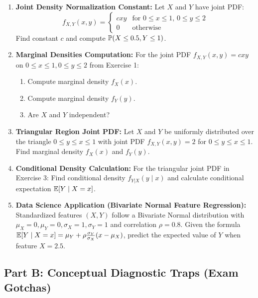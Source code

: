 \begin{enumerate}
\item \textbf{Joint Density Normalization Constant:} Let $X$ and $Y$ have joint PDF:
    $$f_{X,Y}(x, y) = \begin{cases} c x y & \text{for } 0 \le x \le 1, \, 0 \le y \le 2 \\ 0 & \text{otherwise} \end{cases}$$
    Find constant $c$ and compute $\P(X \le 0.5, Y \le 1)$.

\item \textbf{Marginal Densities Computation:} For the joint PDF $f_{X,Y}(x, y) = c xy$ on $0 \le x \le 1, 0 \le y \le 2$ from Exercise 1:
    \begin{enumerate}
        \item Compute marginal density $f_X(x)$.
        \item Compute marginal density $f_Y(y)$.
        \item Are $X$ and $Y$ independent?
    \end{enumerate}

\item \textbf{Triangular Region Joint PDF:} Let $X$ and $Y$ be uniformly distributed over the triangle $0 \le y \le x \le 1$ with joint PDF $f_{X,Y}(x, y) = 2$ for $0 \le y \le x \le 1$.
    Find marginal density $f_X(x)$ and $f_Y(y)$.

\item \textbf{Conditional Density Calculation:} For the triangular joint PDF in Exercise 3:
    Find conditional density $f_{Y|X}(y \mid x)$ and calculate conditional expectation $\E[Y \mid X = x]$.

\item \textbf{Data Science Application (Bivariate Normal Feature Regression):} Standardized features $(X, Y)$ follow a Bivariate Normal distribution with $\mu_X = 0, \mu_Y = 0, \sigma_X = 1, \sigma_Y = 1$ and correlation $\rho = 0.8$. Given the formula $\E[Y \mid X = x] = \mu_Y + \rho \frac{\sigma_Y}{\sigma_X} (x - \mu_X)$, predict the expected value of $Y$ when feature $X = 2.5$.
\end{enumerate}

\subsection*{Part B: Conceptual Diagnostic Traps (Exam Gotchas)}

